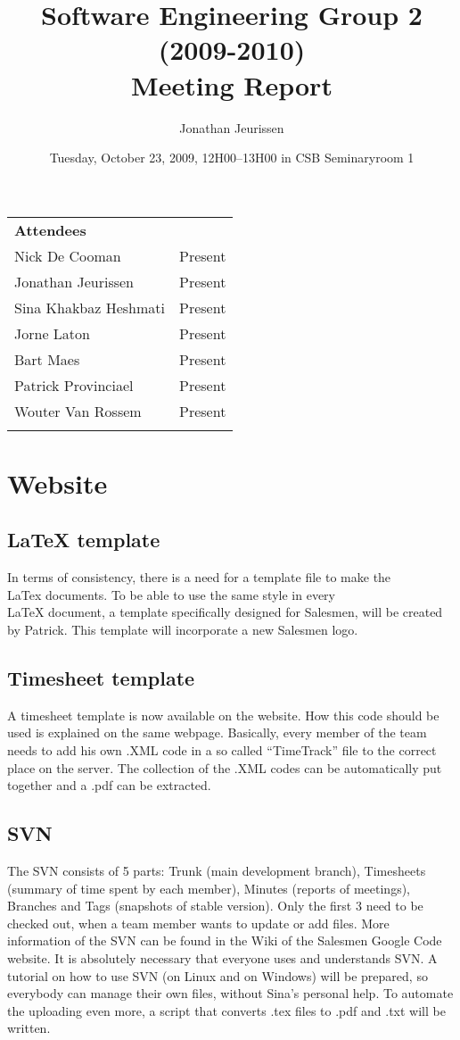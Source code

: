 \documentclass[a4paper, 12pt]{article}
\title{Software Engineering Group 2 (2009-2010) \\Meeting Report}
\author{Jonathan Jeurissen}
\date{ Tuesday, October 23, 2009, 12H00--13H00 in CSB Seminaryroom 1}
\begin{document}
	\maketitle
	
	\begin{tabular}{l l}
		{\large \textbf{Attendees}} \\
		Nick De Cooman & Present \\
		Jonathan Jeurissen & Present \\
		Sina Khakbaz Heshmati & Present \\
		Jorne Laton & Present \\
		Bart Maes & Present \\
		Patrick Provinciael & Present \\
		Wouter Van Rossem & Present \\
		\\
	\end{tabular}	
	
	
	
	
	\section{Website}
	
	\subsection{\LaTeX{} template}
		In terms of consistency, there is a need for a template file to make the \\LaTex{} documents. To be able to use the same style in every \\LaTeX{} document, a template specifically designed for Salesmen, will be created by Patrick. This template will incorporate a new Salesmen logo.
	\subsection{Timesheet template}
A timesheet template is now available on the website\cite{site1}. How this code should be used is explained on the same webpage. Basically, every member of the team needs to add his own .XML code in a so called ``TimeTrack'' file to the correct place on the server. The collection of the .XML codes can be automatically put together and a .pdf can be extracted.
	\subsection{SVN}
The SVN consists of 5 parts: Trunk (main development branch), Timesheets (summary of time spent by each member), Minutes (reports of meetings), Branches and Tags (snapshots of stable version). Only the first 3 need to be checked out, when a team member wants to update or add files. More information of the SVN can be found in the Wiki of the Salesmen Google Code website\cite{site2}. It is absolutely necessary that everyone uses and understands SVN.
A tutorial on how to use SVN (on Linux and on Windows) will be prepared, so everybody can manage their own files, without Sina's personal help. To automate the uploading even more, a script that converts .tex files to .pdf and .txt will be written.
\end{document}
